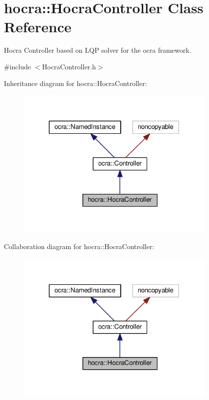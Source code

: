 \hypertarget{classhocra_1_1HocraController}{}\section{hocra\+:\+:Hocra\+Controller Class Reference}
\label{classhocra_1_1HocraController}


Hocra Controller based on L\+QP solver for the ocra framework.  




{\ttfamily \#include $<$Hocra\+Controller.\+h$>$}



Inheritance diagram for hocra\+:\+:Hocra\+Controller\+:
\nopagebreak
\begin{figure}[H]
\begin{center}
\leavevmode
\includegraphics[width=280pt]{de/dc4/classhocra_1_1HocraController__inherit__graph}
\end{center}
\end{figure}


Collaboration diagram for hocra\+:\+:Hocra\+Controller\+:
\nopagebreak
\begin{figure}[H]
\begin{center}
\leavevmode
\includegraphics[width=280pt]{df/d65/classhocra_1_1HocraController__coll__graph}
\end{center}
\end{figure}
